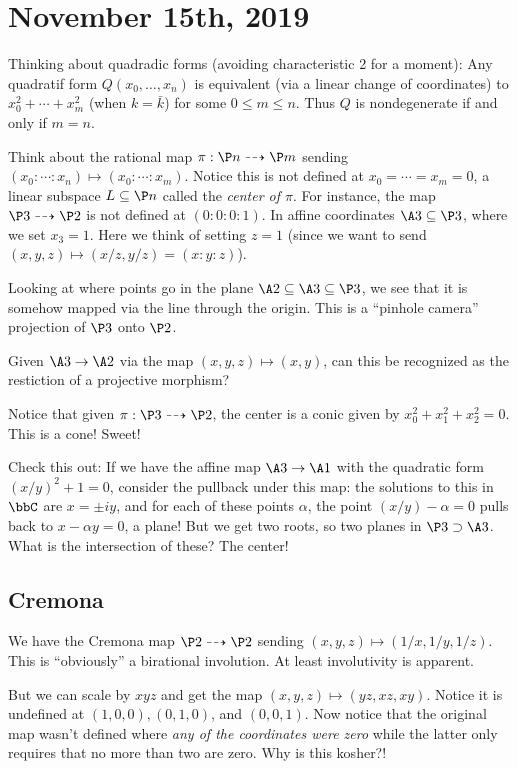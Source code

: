 \documentclass[12pt]{article}
\begin{document}
\section{November 15th, 2019}
Thinking about quadradic forms (avoiding characteristic 2 for a moment): Any quadratif form $Q(x_0,\dots,x_n)$ is equivalent
(via a linear change of coordinates) to $x_0^2+\cdots+x_m^2$ (when $k=\bar k$) for some $0\le m\le n$. Thus $Q$ is nondegenerate 
if and only if $m=n$.

Think about the rational map $\pi:\P n\dashrightarrow \P m$ sending $(x_0:\cdots:x_n)\mapsto (x_0:\cdots:x_m)$. Notice this is not 
defined at $x_0=\cdots=x_m=0$, a linear subspace $L\subseteq \P n$ called the \textit{center of $\pi$}.
For instance, the map $\P3\dashrightarrow\P2$ is not defined at $(0:0:0:1)$. In affine coordinates $\A3\subseteq \P3$, 
where we set $x_3=1$. Here we think of setting $z=1$ (since we want to send $(x,y,z)\mapsto(x/z,y/z)=(x:y:z)$).

Looking at where points go in the plane $\A2\subseteq \A3\subseteq \P3$, we see that it is somehow mapped via the line through the origin. 
This is a ``pinhole camera'' projection of $\P3$ onto $\P2$.
\begin{prob}
	Given $\A3\to\A2$ via the map $(x,y,z)\mapsto (x,y)$, can this be recognized as the restiction of a projective morphism?
\end{prob}

Notice that given $\pi:\P3\dashrightarrow\P2$, the center is a conic given by $x_0^2+x_1^2+x_2^2=0$. This is a cone! Sweet!

Check this out: If we have the affine map $\A3\to\A1$ with the quadratic form $(x/y)^2+1=0$, consider the pullback 
under this map: the solutions to this in $\bbC$ are $x=\pm iy$, and for each of these points $\alpha$, the point $(x/y)-\alpha=0$ 
pulls back to $x-\alpha y=0$, a plane! But we get two roots, so two planes in $\P3\supset \A3$. What is the intersection of these? The center!

\subsection{Cremona}
We have the Cremona map $\P2\dashrightarrow\P2$ sending $(x,y,z)\mapsto(1/x,1/y,1/z)$. This is ``obviously'' a birational involution. 
At least involutivity is apparent.

But we can scale by $xyz$ and get the map $(x,y,z)\mapsto(yz,xz,xy)$. Notice it is undefined at $(1,0,0),(0,1,0)$, and $(0,0,1)$.
Now notice that the original map wasn't defined where \textit{any of the coordinates were zero} while the latter only requires that no more 
than two are zero. Why is this kosher?!
\end{document}
